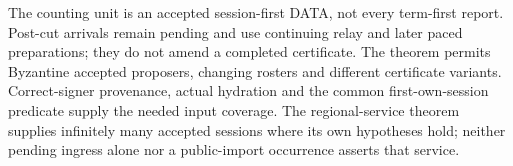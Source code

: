 The counting unit is an accepted session-first DATA, not every
term-first report. Post-cut arrivals remain pending and use continuing
relay and later paced preparations; they do not amend a completed
certificate. The theorem permits Byzantine accepted proposers, changing
rosters and different certificate variants. Correct-signer provenance,
actual hydration and the common first-own-session predicate supply the
needed input coverage. The regional-service theorem supplies infinitely
many accepted sessions where its own hypotheses hold; neither pending
ingress alone nor a public-import occurrence asserts that service.
